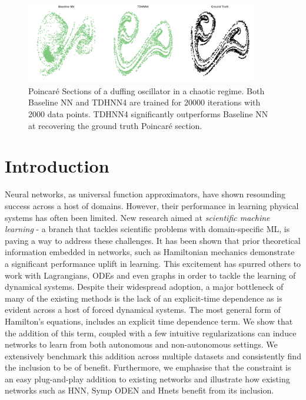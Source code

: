 \documentclass[twoside]{article}
\begin{document}
\begin{figure}[ht!]
\centering
\includegraphics[width=0.9\textwidth]{figures/main_fig.pdf}
\caption{Poincar\'e Sections of a duffing oscillator in a chaotic regime. Both Baseline NN and TDHNN4 are trained for 20000 iterations with 2000 data points. TDHNN4 significantly outperforms Baseline NN at recovering the ground truth Poincar\'e section.}
\end{figure}
\label{fig.chaos}
\section{Introduction}

Neural networks, as universal function approximators, have shown resounding success across a host of domains. However, their performance in learning physical systems has often been limited. New research aimed at \textit{scientific machine learning} - a branch that tackles scientific problems with domain-specific ML, is paving a way to address these challenges. It has been shown that prior theoretical information embedded in networks, such as Hamiltonian mechanics \cite{greydanus} demonstrate a significant performance uplift in learning. This excitement has spurred others to work with Lagrangians, ODEs and even graphs in order to tackle the learning of dynamical systems. Despite their widespread adoption, a major bottleneck of many of the existing methods is the lack of an explicit-time dependence as is evident across a host of forced dynamical systems. The most general form of Hamilton's equations, includes an explicit time dependence term. We show that the addition of this term, coupled with a few intuitive regularizations can induce networks to learn from both autonomous and non-autonomous settings. We extensively benchmark this addition across multiple datasets and consistently find the inclusion to be of benefit. Furthermore, we emphasise that the constraint is an easy plug-and-play addition to existing networks and illustrate how existing networks such as HNN, Symp ODEN and Hnets benefit from its inclusion. 
\end{document}
